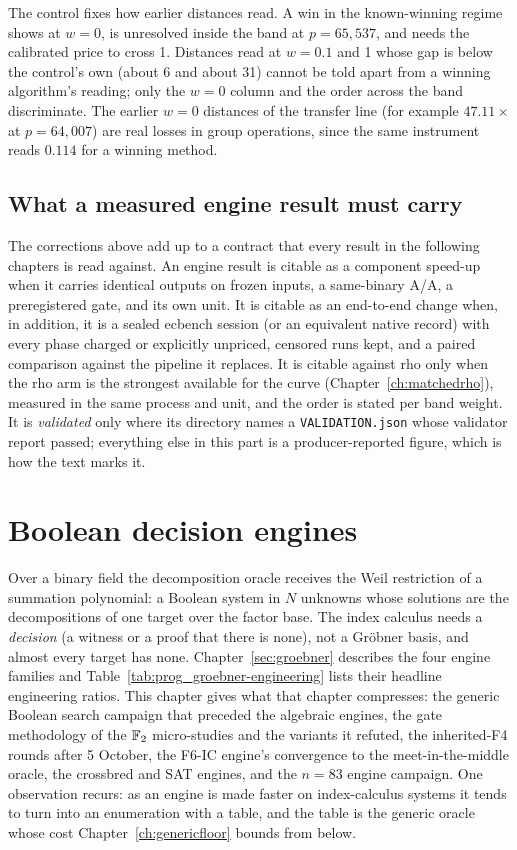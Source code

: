 \noindent The control fixes how earlier distances read. A win in the
known-winning regime shows at $w=0$, is unresolved inside the band at
$p=65{,}537$, and needs the calibrated price to cross 1. Distances read at
$w=0.1$ and 1 whose gap is below the control's own (about 6 and about 31)
cannot be told apart from a winning algorithm's reading; only the $w=0$
column and the order across the band discriminate. The earlier $w=0$
distances of the transfer line (for example $47.11\times$ at $p=64{,}007$)
are real losses in group operations, since the same instrument reads $0.114$
for a winning method.

\section{What a measured engine result must carry}\label{sec:em-contract}

The corrections above add up to a contract that every result in the
following chapters is read against. An engine result is citable as a
component speed-up when it carries identical outputs on frozen inputs, a
same-binary A/A, a preregistered gate, and its own unit. It is citable as an
end-to-end change when, in addition, it is a sealed ecbench session (or an
equivalent native record) with every phase charged or explicitly unpriced,
censored runs kept, and a paired comparison against the pipeline it
replaces. It is citable against rho only when the rho arm is the strongest
available for the curve (Chapter~\ref{ch:matchedrho}), measured in the same
process and unit, and the order is stated per band weight. It is
\emph{validated} only where its directory names a \texttt{VALIDATION.json}
whose validator report passed; everything else in this part is a
producer-reported figure, which is how the text marks it.
\chapter{Boolean decision engines}\label{ch:boolean}

Over a binary field the decomposition oracle receives the Weil restriction
of a summation polynomial: a Boolean system in $N$ unknowns whose solutions
are the decompositions of one target over the factor base. The index
calculus needs a \emph{decision} (a witness or a proof that there is none), not a
Gr\"obner basis, and almost every target has none. Chapter~\ref{sec:groebner}
describes the four engine families and Table~\ref{tab:prog_groebner-engineering}
lists their headline engineering ratios. This chapter gives what that
chapter compresses: the generic Boolean search campaign that preceded the
algebraic engines, the gate methodology of the $\mathbb{F}_2$ micro-studies and the
variants it refuted, the inherited-F4 rounds after 5 October, the F6-IC
engine's convergence to the meet-in-the-middle oracle, the crossbred and
SAT engines, and the $n=83$ engine campaign. One observation recurs: as an
engine is made faster on index-calculus systems it tends to turn into an
enumeration with a table, and the table is the generic oracle whose cost
Chapter~\ref{ch:genericfloor} bounds from below.


